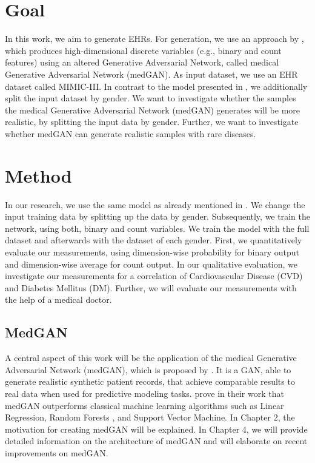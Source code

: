 \documentclass[11pt, a4paper, oneside]{book}
\begin{document}
\section{Goal}
In this work, we aim to generate EHRs. For generation, we use an approach by \citep{Choi2017}, which produces high-dimensional discrete variables (e.g., binary and count features) using an altered Generative Adversarial Network, called medical Generative Adversarial Network (medGAN). As input dataset, we use an EHR dataset called MIMIC-III. In contrast to the model presented in \citep{Choi2017}, we additionally split the input dataset by gender.
 We want to investigate whether the samples the medical Generative Adversarial Network (medGAN) generates will be more realistic, by splitting the input data by gender. Further, we want to investigate whether medGAN can generate realistic samples with rare diseases.
 
\section{Method}
In our research, we use the same model as already mentioned in \citep{Choi2017}. We change the input training data by splitting up the data by gender. Subsequently, we train the network, using both, binary and count variables. We train the model with the full dataset and afterwards with the dataset of each gender. First, we quantitatively evaluate our measurements, using dimension-wise probability for binary output and dimension-wise average for count output. In our qualitative evaluation, we investigate our measurements for a correlation of Cardiovascular Disease (CVD) and Diabetes Mellitus (DM). Further, we will evaluate our measurements with the help of a medical doctor.

\subsection{MedGAN}
A central aspect of this work will be the application of the medical Generative Adversarial Network (medGAN), which is proposed by \citep{Choi2017}.
It is a GAN, able to generate realistic synthetic patient records, that achieve comparable results to real data when used for predictive modeling tasks. \citep{Choi2017} prove in their work that medGAN outperforms classical machine learning algorithms such as Linear Regression, Random Forests , and Support Vector Machine. 
In Chapter 2, the motivation for creating medGAN will be explained. In Chapter 4, we will provide detailed information on the architecture of medGAN and will elaborate on recent improvements on medGAN.
\end{document}
